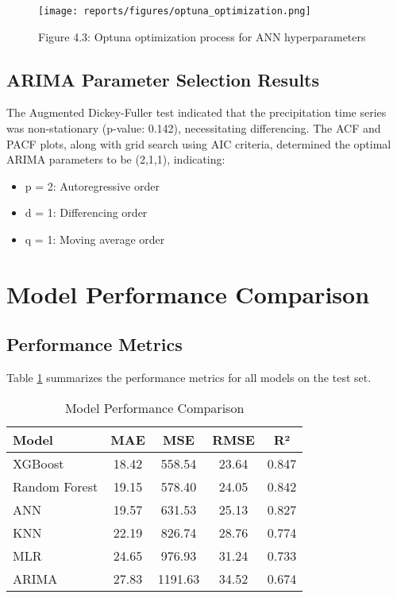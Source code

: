 \documentclass[12pt]{article}
\begin{document}
\begin{figure}[h]
\centering
\texttt{[image: reports/figures/optuna\_optimization.png]}
\caption{Figure 4.3: Optuna optimization process for ANN hyperparameters}
\label{fig:chap4_fig3_optuna_optimization}
\end{figure}

\subsection{ARIMA Parameter Selection Results}
\label{subsec:arima_selection_results}

The Augmented Dickey-Fuller test indicated that the precipitation time series was non-stationary (p-value: 0.142), necessitating differencing. The ACF and PACF plots, along with grid search using AIC criteria, determined the optimal ARIMA parameters to be (2,1,1), indicating:
\begin{itemize}
    \item p = 2: Autoregressive order
    \item d = 1: Differencing order
    \item q = 1: Moving average order
\end{itemize}

\section{Model Performance Comparison}
\label{sec:model_comparison}

\subsection{Performance Metrics}
\label{subsec:metrics_comparison}

Table \ref{tab:model_performance} summarizes the performance metrics for all models on the test set.

\begin{table}[h]
\centering
\caption{Model Performance Comparison}
\label{tab:model_performance}
\begin{tabular}{|l|c|c|c|c|}
\hline
\textbf{Model} & \textbf{MAE} & \textbf{MSE} & \textbf{RMSE} & \textbf{R²} \\
\hline
XGBoost & 18.42 & 558.54 & 23.64 & 0.847 \\
\hline
Random Forest & 19.15 & 578.40 & 24.05 & 0.842 \\
\hline
ANN & 19.57 & 631.53 & 25.13 & 0.827 \\
\hline
KNN & 22.19 & 826.74 & 28.76 & 0.774 \\
\hline
MLR & 24.65 & 976.93 & 31.24 & 0.733 \\
\hline
ARIMA & 27.83 & 1191.63 & 34.52 & 0.674 \\
\hline
\end{tabular}
\end{table}
\end{document}
